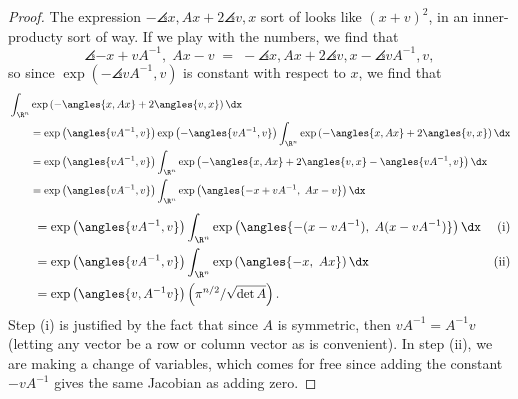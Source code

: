 \documentclass[12pt,letterpaper]{article}
\begin{document}
\begin{enumerate}
\begin{enumerate}[label=(\alph*)]
	\begin{proof}
	The expression $-\angles{x,Ax}+2\angles{v,x}$ sort of looks like $(x+v)^2$, in an inner-producty sort of way. If we play with the numbers, we find that 
	$$\angles{-x+vA^{-1},\; Ax-v} \;=\; -\angles{x,Ax} + 2\angles{v,x} - \angles{vA^{-1},v},$$
	so since $\exp(- \angles{vA^{-1},v})$ is constant with respect to $x$, we find that 
	\begin{align*}
	&\int_{\R^n} \exp\left(-\angles{x,Ax}+2\angles{v,x}\right)\dx \\
	&\qquad = \exp\left(\angles{vA^{-1},v}\right) \exp\left(- \angles{vA^{-1},v}\right) \int_{\R^n} \exp\left(-\angles{x,Ax}+2\angles{v,x}\right)\dx \\
	&\qquad = \exp\left(\angles{vA^{-1},v}\right) \int_{\R^n} \exp\left(-\angles{x,Ax}+2\angles{v,x} - \angles{vA^{-1},v}\right)\dx \\
	&\qquad = \exp\left(\angles{vA^{-1},v}\right) \int_{\R^n} \exp\left(\angles{-x+vA^{-1},\; Ax-v}\right)\dx \\
	\end{align*}
	\begin{align*}		
	&\qquad = \exp\left(\angles{vA^{-1},v}\right) \int_{\R^n} \exp\left(\angles{-(x-vA^{-1}),\; A(x-vA^{-1})}\right)\dx &\text{(i)}\\
	&\qquad = \exp\left(\angles{vA^{-1},v}\right) \int_{\R^n} \exp\left(\angles{-x,\; Ax}\right)\dx &\text{(ii)}\\
	&\qquad =  \exp\left(\angles{v,A^{-1}v}\right) \left(\pi^{n/2}/\sqrt{\det A}\right).
	\end{align*}
	Step (i) is justified by the fact that since $A$ is symmetric, then $vA^{-1}=A^{-1}v$ (letting any vector be a row or column vector as is convenient). In step (ii), we are making a change of variables, which comes for free since adding the constant $-vA^{-1}$ gives the same Jacobian as adding zero. 
	\end{proof}
	
	\end{enumerate}

\end{enumerate}
\end{document}
